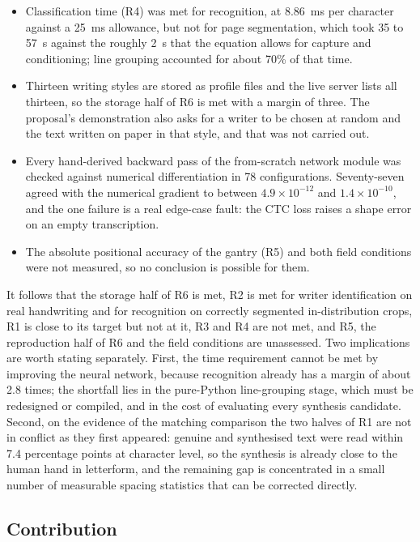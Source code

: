 \begin{itemize}
  \item Classification time (R4) was met for recognition, at 8.86~ms per character against a 25~ms allowance, but not for page segmentation, which took 35 to 57~s against the roughly 2~s that the equation allows for capture and conditioning; line grouping accounted for about 70\% of that time.
  \item Thirteen writing styles are stored as profile files and the live server lists all thirteen, so the storage half of R6 is met with a margin of three. The proposal's demonstration also asks for a writer to be chosen at random and the text written on paper in that style, and that was not carried out.
  \item Every hand-derived backward pass of the from-scratch network module was checked against numerical differentiation in 78 configurations. Seventy-seven agreed with the numerical gradient to between $4.9\times10^{-12}$ and $1.4\times10^{-10}$, and the one failure is a real edge-case fault: the CTC loss raises a shape error on an empty transcription.
  \item The absolute positional accuracy of the gantry (R5) and both field conditions were not measured, so no conclusion is possible for them.
\end{itemize}
It follows that the storage half of R6 is met, R2 is met for writer identification on real handwriting and for recognition on correctly segmented in-distribution crops, R1 is close to its target but not at it, R3 and R4 are not met, and R5, the reproduction half of R6 and the field conditions are unassessed.
Two implications are worth stating separately.
First, the time requirement cannot be met by improving the neural network, because recognition already has a margin of about 2.8 times; the shortfall lies in the pure-Python line-grouping stage, which must be redesigned or compiled, and in the cost of evaluating every synthesis candidate.
Second, on the evidence of the matching comparison the two halves of R1 are not in conflict as they first appeared: genuine and synthesised text were read within 7.4 percentage points at character level, so the synthesis is already close to the human hand in letterform, and the remaining gap is concentrated in a small number of measurable spacing statistics that can be corrected directly.


\subsection{Contribution}
\label{sec:con-contribution}

